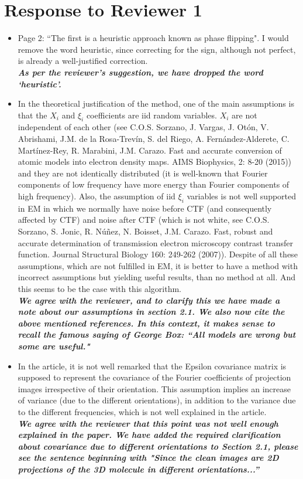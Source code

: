 \documentclass{article}
\begin{document}
\section*{Response to Reviewer 1}
\begin{itemize}
 \item Page 2: ``The first is a heuristic approach known as phase flipping". I 
would remove the word heuristic, since correcting for the sign, although not 
perfect, is already a well-justified correction. \\
\textbf{\textit{ As per the reviewer's suggestion, we have dropped the word `heuristic'.}}

 \item In the theoretical justification of the method, one of the main 
assumptions is that the $X_i$ and $\xi_i$ coefficients are iid random variables. 
$X_i$ are not independent of each other (see C.O.S. Sorzano, J. Vargas, J. Otón, 
V. Abrishami, J.M. de la Rosa-Trevín, S. del Riego, A. Fernández-Alderete, C. 
Martínez-Rey, R. Marabini, J.M. Carazo. Fast and accurate conversion of atomic 
models into electron density maps. AIMS Biophysics, 2: 8-20 (2015)) and they are 
not identically distributed (it is well-known that Fourier components of low 
frequency have more energy than Fourier components of high frequency). Also, the 
assumption of iid $\xi_i$ variables is not well supported in EM in which we 
normally have noise before CTF (and consequently affected by CTF) and noise 
after CTF (which is not white, see C.O.S. Sorzano, S. Jonic, R. Núñez, N. 
Boisset, J.M. Carazo. Fast, robust and accurate determination of transmission 
electron microscopy contrast transfer function. Journal Structural
Biology 160: 249-262 (2007)). Despite of all these assumptions, which are not 
fulfilled in EM, it is better to have a method with incorrect assumptions but 
yielding useful results, than no method at all. And this seems to be the case 
with this algorithm. \\
\textbf{\textit{We agree with the reviewer, and to clarify this we have made a note 
about our assumptions in section 2.1. We also now cite the above
mentioned references. In this context, it makes sense to recall the famous saying of George Box: ``All models are wrong but some are useful." }}

\item In the article, it is not well remarked that the Epsilon covariance matrix 
is supposed to represent the covariance of the Fourier coefficients of 
projection images irrespective of their orientation. This assumption implies an 
increase of variance (due to the different orientations), in addition to the 
variance due to the different frequencies, which is not well explained in the 
article. \\
\textbf{\textit{We agree with the reviewer that this point was not well enough explained in the paper. 
We have added the required clarification about covariance due to different orientations to  Section 2.1,
please see the sentence beginning with "Since the clean images are 2D projections of the 3D molecule in different orientations...''}}


\end{itemize}
\end{document}
